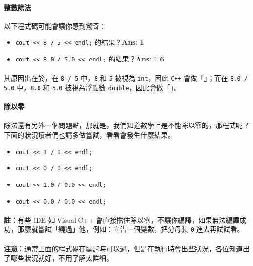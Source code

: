 \documentclass[12pt,a4paper,oneside]{report}
\begin{document}
\begin{CJK}{UTF8}{bkai}
\paragraph{整數除法}以下程式碼可能會讓你感到驚奇：
\begin{itemize}
\item \lstinline!cout << 8 / 5 << endl;! 的結果？{\textbf{Ans: 1}}
\item \lstinline!cout << 8.0 / 5.0 << endl;! 的結果？{\textbf{Ans: 1.6}}
\end{itemize}

\paragraph{}其原因出在於，在 \lstinline!8 / 5! 中，\lstinline!8! 和 \lstinline!5! 被視為 \lstinline!int!，因此 \texttt{C++} 會做「」；而在 \lstinline!8.0 / 5.0! 中，\lstinline!8.0! 和 \lstinline!5.0! 被視為浮點數 \lstinline!double!，因此會做「」。

\paragraph{除以零}除法還有另外一個問題點，那就是，我們知道數學上是不能除以零的，那程式呢？下面的狀況讀者們也請多做嘗試，看看會發生什麼結果。

\begin{itemize}
\item \lstinline!cout << 1 / 0 << endl;!
\item \lstinline!cout << 0 / 0 << endl;!
\item \lstinline!cout << 1.0 / 0.0 << endl;!
\item \lstinline!cout << 0.0 / 0.0 << endl;!
\end{itemize}

\paragraph{}\textbf{註}：有些 IDE 如 Visual C++ 會直接擋住除以零，不讓你編譯，如果無法編譯成功，那麼就嘗試「繞過」他，例如：宣告一個變數，把分母裝 \lstinline!0! 進去再試試看。
\paragraph{}\textbf{注意}：通常上面的程式碼在編譯時可以過，但是在執行時會出些狀況，各位知道出了哪些狀況就好，不用了解太詳細。


\end{CJK}
\end{document}
